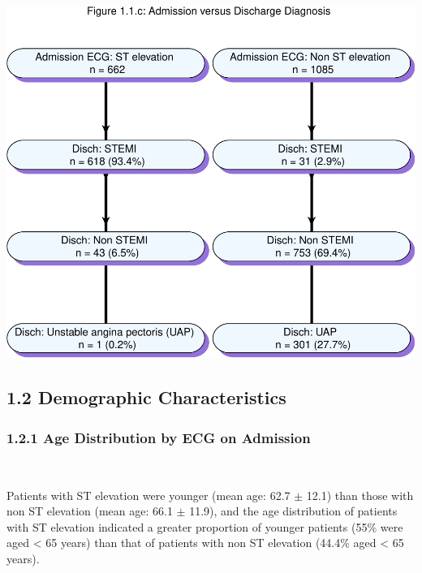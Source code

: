 \documentclass[
]{article}
\begin{document}
~

\includegraphics{ACSIS_2024_v1_pdf_files/figure-latex/unnamed-chunk-8-1.pdf}

\pagebreak

\subsection{1.2 Demographic
Characteristics}\label{demographic-characteristics}

\subsubsection{1.2.1 Age Distribution by ECG on
Admission}\label{age-distribution-by-ecg-on-admission}

~

Patients with ST elevation were younger (mean age: 62.7 \(\pm\) 12.1)
than those with non ST elevation (mean age: 66.1 \(\pm\) 11.9), and the
age distribution of patients with ST elevation indicated a greater
proportion of younger patients (55\% were aged \textless{} 65 years)
than that of patients with non ST elevation (44.4\% aged \textless{} 65
years).

~
\end{document}
